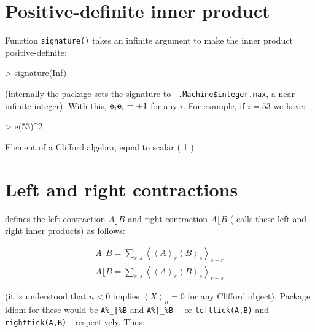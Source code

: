 \documentclass{birkjour}
\theoremstyle{definition}
\theoremstyle{remark}
\numberwithin{equation}{section}
\begin{document}
\section{Positive-definite inner product}

Function {\tt signature()} takes an infinite argument to make the
inner product positive-definite:

\begin{Schunk}
\begin{Sinput}
> signature(Inf)
\end{Sinput}
\end{Schunk}

(internally the package sets the signature to {\tt
  .Machine\$integer.max}, a near-infinite integer).  With this,
${\bf e}_{i}{\bf e}_{i}=+1$ for any $i$.  For example, if
  $i=53$ we have:

\begin{Schunk}
\begin{Sinput}
> e(53)^2
\end{Sinput}
\begin{Soutput}
Element of a Clifford algebra, equal to
scalar ( 1 )
\end{Soutput}
\end{Schunk}


\section{Left and right contractions}

\cite{dorst2002} defines the left contraction $A\rfloor B$ and right
contraction $A\lfloor B$ (\cite{chisholm2012} calls these left and
right inner products) as follows:

\begin{eqnarray}
\displaystyle A\rfloor B = \sum_{r,s}\left\langle\left\langle
A\right\rangle_r\left\langle B\right\rangle_s\right\rangle_{s-r}\\
\displaystyle A\lfloor B = \sum_{r,s}\left\langle\left\langle
A\right\rangle_r\left\langle B\right\rangle_s\right\rangle_{r-s}
\end{eqnarray}

(it is understood that $n<0$ implies $\left\langle
  X\right\rangle_n=0$ for any Clifford object).
Package idiom for these would be {\tt A\%\_|\%B} and {\tt A\%|\_\%B}
---or {\tt lefttick(A,B)} and {\tt righttick(A,B)}---respectively.
Thus:
\end{document}

